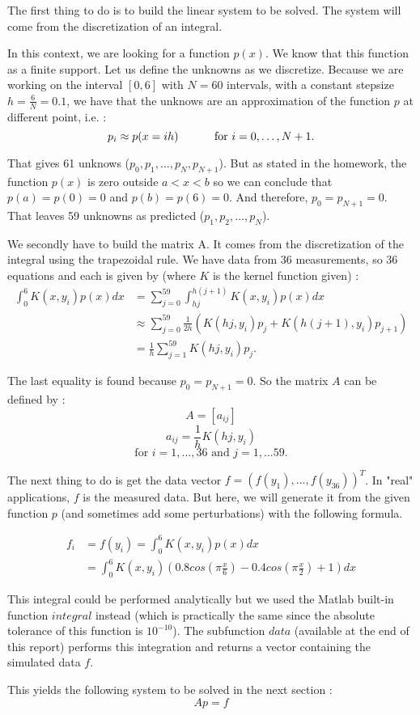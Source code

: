 The first thing to do is to build the linear system to be solved. The system will come from the discretization of an integral. 

In this context, we are looking for a function $p(x)$. We know that this function as a finite support. Let us define the unknowns as we discretize. Because we are working on the interval $[0,6]$ with $N=60$ intervals, with a constant stepsize $h=\frac{6}{N}=0.1$, we have that the unknows are an approximation of the function $p$ at different point, i.e. : 
$$p_i \approx p(x=ih) \hspace*{1cm} \text{ for } i = 0, \dots, N+1. $$

That gives 61 unknows ($p_0,p_1,...,p_N,p_{N+1}$). But as stated in the homework, the function $p(x)$ is zero outside $a<x<b$ so we can conclude that $p(a)=p(0)=0$ and $p(b)=p(6)=0$. And therefore, $p_0=p_{N+1}=0$. That leaves 59 unknowns as predicted ($p_1,p_2,...,p_N$).

We secondly have to build the matrix A. It comes from the discretization of the integral using the trapezoidal rule. We have data from 36 measurements, so 36 equations and each is given by (where $K$ is the kernel function given) : 
\begin{align*}
\int_0^{6}K(x,y_i)p(x)dx &=\sum_{j=0}^{59} \int^{h(j+1)}_{hj} K(x,y_i)p(x)dx\\
&\approx \sum_{j=0}^{59} \frac{1}{2h}(K(hj,y_i)p_j+K(h(j+1),y_i)p_{j+1})\\
&=\frac{1}{h}\sum_{j=1}^{59} K(hj,y_i)p_j.
\end{align*}

The last equality is found because $p_0=p_{N+1}=0$. So the matrix $A$ can be defined by : 
$$A=[a_{ij}]$$
$$a_{ij} = \frac{1}{h}K(hj,y_i)$$
$$\text{for }i=1,...,36 \text{ and }j=1,...59.$$

The next thing to do is get the data vector $f=(f(y_1),...,f(y_{36}))^T$. In "real" applications, $f$ is the measured data. But here, we will generate it from the given function $p$ (and sometimes add some perturbations) with the following formula. %

\begin{align*}
f_i&=f(y_i)=\int_0^{6}K(x,y_i)p(x)dx\\
&=\int_0^{6}K(x,y_i)(0.8cos(\pi\frac{x}{6})-0.4cos(\pi\frac{x}{2})+1)dx
\end{align*}

This integral could be performed analytically but we used the Matlab built-in function $integral$ instead (which is practically the same since the absolute tolerance of this function is $10^{-10}$). The subfunction $data$ (available at the end of this report) performs this integration and returns a vector containing the simulated data $f$.

This yields the following system to be solved in the next section : 
$$Ap=f$$